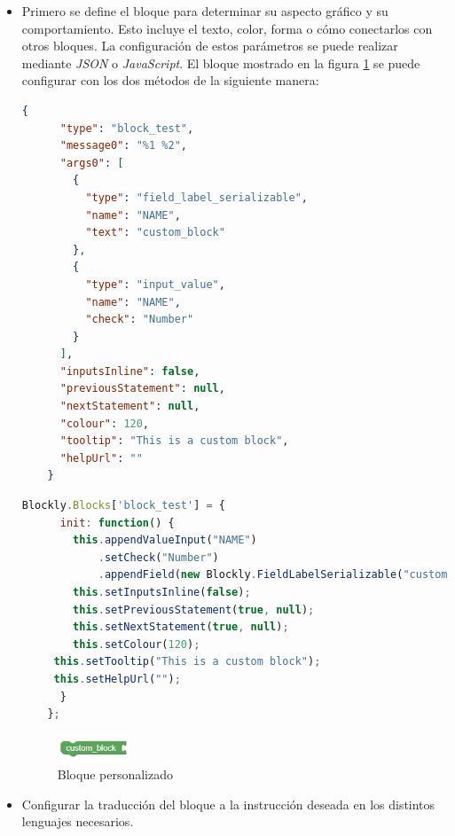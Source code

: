 \begin{itemize}
    \item Primero se define el bloque para determinar su aspecto gráfico y su comportamiento. Esto incluye el texto, color, forma o cómo conectarlos con otros bloques. La configuración de estos parámetros se puede realizar mediante \textit{JSON} o \textit{JavaScript}. El bloque mostrado en la figura \ref{fig:customblock} se puede configurar con los dos métodos de la siguiente manera:
    
     \begin{lstlisting}[language=json, caption=Código en JSON para configurar un bloque personalizado]
     {
      "type": "block_test",
      "message0": "%1 %2",
      "args0": [
        {
          "type": "field_label_serializable",
          "name": "NAME",
          "text": "custom_block"
        },
        {
          "type": "input_value",
          "name": "NAME",
          "check": "Number"
        }
      ],
      "inputsInline": false,
      "previousStatement": null,
      "nextStatement": null,
      "colour": 120,
      "tooltip": "This is a custom block",
      "helpUrl": ""
    }
    \end{lstlisting}

    \begin{lstlisting}[language=javascript, caption=Código en \textit{JavaScript} para configurar un bloque personalizado]
    Blockly.Blocks['block_test'] = {
      init: function() {
        this.appendValueInput("NAME")
            .setCheck("Number")
            .appendField(new Blockly.FieldLabelSerializable("custom_block"), "NAME");
        this.setInputsInline(false);
        this.setPreviousStatement(true, null);
        this.setNextStatement(true, null);
        this.setColour(120);
     this.setTooltip("This is a custom block");
     this.setHelpUrl("");
      }
    };
    \end{lstlisting}

    \begin{figure}[H]
    \centering
    \includegraphics[width=0.2\textwidth]{img/CustomBlock.png}
    \caption{Bloque personalizado} \label{fig:customblock}
    \end{figure}

    \item Configurar la traducción del bloque a la instrucción deseada en los distintos lenguajes necesarios.
    

\end{itemize}
